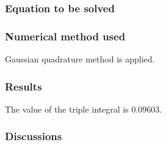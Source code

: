 \documentclass[12pt]{article}
\begin{document}
\subsubsection{Equation to be solved}

\indent


\subsubsection{Numerical method used}
Gaussian quadrature method is applied.

\subsubsection{Results}

The value of the triple integral is 0.09603.


\subsubsection{Discussions}

\end{document}
